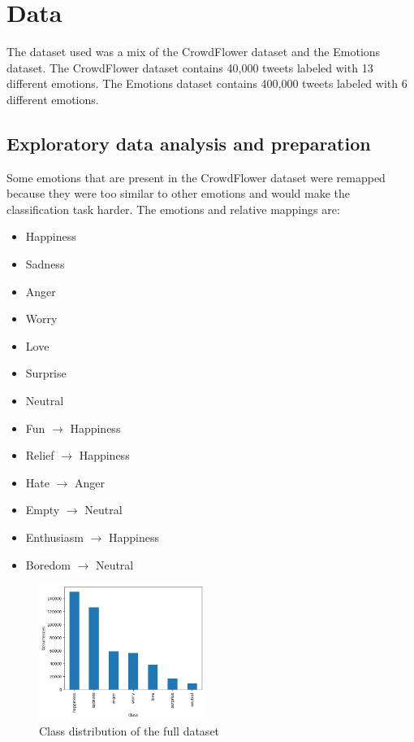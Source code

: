 \section{Data}
The dataset used was a mix of the CrowdFlower 
dataset\cite{crowdflower_dataset} and the
Emotions dataset\cite{emotions_dataset}.
The CrowdFlower dataset contains 40,000 tweets
labeled with 13 different emotions. The Emotions 
dataset contains 400,000 tweets labeled with 6 
different emotions.

\subsection{Exploratory data analysis and preparation}
Some emotions that are present in the
CrowdFlower dataset were remapped because they
were too similar to other emotions and 
would make the classification task harder.
The emotions and relative mappings are:
\begin{itemize}
    \item Happiness
    \item Sadness
    \item Anger
    \item Worry
    \item Love
    \item Surprise
    \item Neutral
    \item Fun $\rightarrow$ Happiness
    \item Relief $\rightarrow$ Happiness
    \item Hate $\rightarrow$ Anger
    \item Empty $\rightarrow$ Neutral
    \item Enthusiasm $\rightarrow$ Happiness
    \item Boredom $\rightarrow$ Neutral
\end{itemize}

\begin{figure}[H]
    \centering
    \includegraphics[width=0.48\textwidth]{assets/class_distribution.png}
    \caption{Class distribution of the full dataset}
    \label{fig:class_distribution}
\end{figure}

